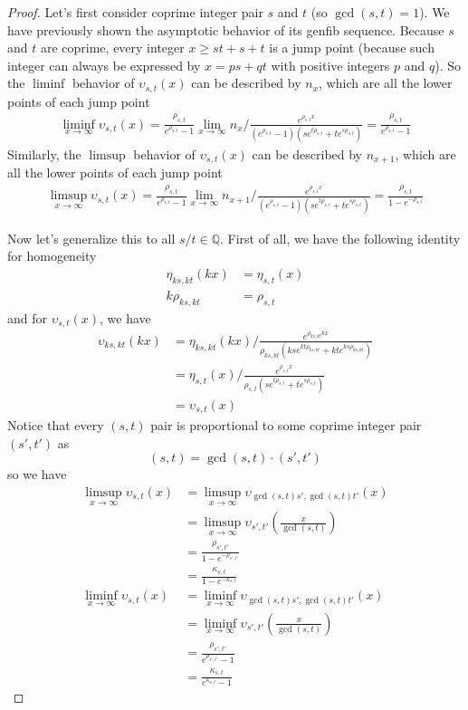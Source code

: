 \documentclass[]{article}
\begin{document}
\begin{proof}
	Let's first consider coprime integer pair $s$ and $t$ (so $\gcd(s, t) = 1$). We have previously shown the asymptotic behavior of its genfib sequence. Because $s$ and $t$ are coprime, every integer $x \ge st + s + t$ is a jump point (because such integer can always be expressed by $x = ps+qt$ with positive integers $p$ and $q$). So the $\liminf$ behavior of $ \upsilon_{s,t}(x)$ can be described by $n_x$, which are all the lower points of each jump point
	\begin{align*}
	\liminf_{x\to\infty} \upsilon_{s,t}(x) = \frac{\rho_{s,t}}{e^{\rho_{s,t}} - 1} \lim_{x\to\infty} n_x  \big/ \frac{e^{\rho_{s,t} x}}{( e^{\rho_{s,t}} - 1)(s e^{t\rho_{s,t}} + t e^{s\rho_{s,t}})}  = \frac{\rho_{s,t}}{e^{\rho_{s,t}} - 1}
	\end{align*}
	Similarly, the $\limsup$ behavior of $ \upsilon_{s,t}(x)$ can be described by $n_{x+1}$, which are all the lower points of each jump point
	\begin{align*}
	\limsup_{x\to\infty} \upsilon_{s,t}(x) = \frac{\rho_{s,t}}{e^{\rho_{s,t}} - 1} \lim_{x\to\infty} n_{x+1}  \big/ \frac{e^{\rho_{s,t} x}}{( e^{\rho_{s,t}} - 1)(s e^{t\rho_{s,t}} + t e^{s\rho_{s,t}})}  = \frac{\rho_{s,t}}{1 - e^{-\rho_{s,t}}}
	\end{align*}

	Now let's generalize this to all $s/t\in\mathbb{Q}$. First of all, we have the following identity for homogeneity
	\begin{align*}
	\eta_{ks,kt}(kx) &= \eta_{s, t}(x) \\
	k\rho_{ks,kt} &= \rho_{s,t}
	\end{align*}
	and for $\upsilon_{s,t}(x)$, we have
	\begin{align*}
	\upsilon_{ks,kt}(kx) &= \eta_{ks,kt}(kx) \big/ \frac{e^{\rho_{ks,kt} kx}}{\rho_{ks,kt}(ks e^{kt\rho_{ks,kt}} + kte^{ks\rho_{ks,kt}})} \\
		&= \eta_{s,t}(x) \big/ \frac{e^{\rho_{s,t} x}}{\rho_{s,t}(s e^{t\rho_{s,t}} + te^{s\rho_{s,t}})}\\
		&= \upsilon_{s,t}(x)
	\end{align*}
    Notice that every $(s,t)$ pair is proportional to some coprime integer pair $(s', t')$ as
	\[
	 (s,t) = \gcd(s,t)\cdot(s',t')
	\]
	so we have
	\begin{align*}
	\limsup_{x\to\infty} \upsilon_{s,t}(x) &= \limsup_{x\to\infty} \upsilon_{\gcd(s,t)s',\gcd(s,t)t'}(x) \\
	&= \limsup_{x\to\infty} \upsilon_{s',t'}\left(\frac{x}{\gcd(s,t)}\right)\\
	&= \frac{\rho_{s',t'}}{1 - e^{-\rho_{s',t'}}}\\
	&= \frac{\kappa_{s,t}}{1 - e^{-\kappa_{s,t}}}\\
	\liminf_{x\to\infty} \upsilon_{s,t}(x) &= \liminf_{x\to\infty} \upsilon_{\gcd(s,t)s',\gcd(s,t)t'}(x) \\
	&= \liminf_{x\to\infty} \upsilon_{s',t'}\left(\frac{x}{\gcd(s,t)}\right)\\
	&= \frac{\rho_{s',t'}}{e^{\rho_{s',t'}} - 1}\\
	&= \frac{\kappa_{s,t}}{e^{\kappa_{s,t}} - 1}
	\end{align*}


\end{proof}
\end{document}
